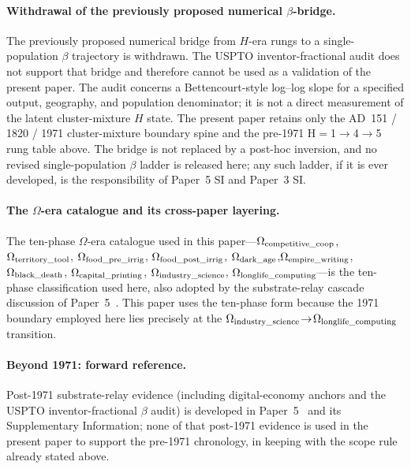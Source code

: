 \paragraph{Withdrawal of the previously proposed numerical \(\beta\)-bridge.}
The previously proposed numerical bridge from \(H\)-era rungs to a single-population \(\beta\) trajectory is withdrawn. The USPTO inventor-fractional audit does not support that bridge and therefore cannot be used as a validation of the present paper. The audit concerns a Bettencourt-style log--log slope for a specified output, geography, and population denominator; it is not a direct measurement of the latent cluster-mixture \(H\) state. The present paper retains only the AD~151 / 1820 / 1971 cluster-mixture boundary spine and the pre-1971 H${=}$1$\to$4$\to$5 rung table above. The bridge is not replaced by a post-hoc inversion, and no revised single-population \(\beta\) ladder is released here; any such ladder, if it is ever developed, is the responsibility of Paper~5 SI and Paper~3 SI.

\paragraph{The $\Omega$-era catalogue and its cross-paper layering.}
The ten-phase $\Omega$-era catalogue used in this paper---$\Omega_{\rm competitive\_coop}$, $\Omega_{\rm territory\_tool}$, $\Omega_{\rm food\_pre\_irrig}$, $\Omega_{\rm food\_post\_irrig}$, $\Omega_{\rm dark\_age}$,\linebreak $\Omega_{\rm empire\_writing}$, $\Omega_{\rm black\_death}$, $\Omega_{\rm capital\_printing}$, $\Omega_{\rm industry\_science}$, $\Omega_{\rm longlife\_computing}$---is the ten-phase classification used here, also adopted by the substrate-relay cascade discussion of Paper~5~\cite{Kato2026e}. This paper uses the ten-phase form because the 1971 boundary employed here lies precisely at the $\Omega_{\rm industry\_science}\!\to\!\Omega_{\rm longlife\_computing}$ transition.

\paragraph{Beyond 1971: forward reference.}
Post-1971 substrate-relay evidence (including digital-economy anchors and the USPTO inventor-fractional $\beta$ audit) is developed in Paper~5~\cite{Kato2026e} and its Supplementary Information; none of that post-1971 evidence is used in the present paper to support the pre-1971 chronology, in keeping with the scope rule already stated above.




